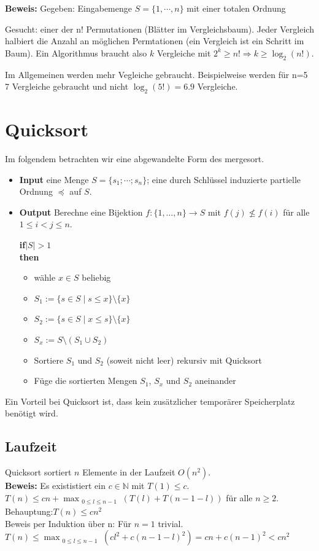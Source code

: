 \documentclass{article}
\begin{document}
\textbf{Beweis:}
Gegeben: Eingabemenge $S=\{1,\cdots,n\}$ mit einer totalen Ordnung

Gesucht: einer der n! Permutationen (Blätter im Vergleichsbaum). 
Jeder Vergleich halbiert die Anzahl an möglichen Permtationen (ein Vergleich ist ein Schritt im Baum).
Ein Algorithmus braucht also $k$ Vergleiche mit $2^k\ge n! $$\Rightarrow k\ge \log_2(n!)$.

Im Allgemeinen werden mehr Vegleiche gebraucht. Beispielweise werden für n=5 7 Vergleiche gebraucht und nicht $\log_2(5!)=6.9$ Vergleiche.

\section{Quicksort}
Im folgendem betrachten wir eine abgewandelte Form des mergesort.

\begin{itemize}\item\textbf{Input}
eine  Menge $S=\{s_1; \cdots ;s_n \}$; eine durch Schlüssel induzierte partielle Ordnung $\preceq$ auf $S$.\item \textbf{Output}
Berechne eine Bijektion $f \colon \{1,\dots,n\} \to S$ mit $f(j) \not\le f(i)$ für alle $1\le i<j \le n$.


\textbf{if}{$|S| > 1$} \\
\textbf{then} \begin{itemize} \item wähle $x\in S$ beliebig
     \item $S_1 := \{s \in S \mid s \leq x\} \setminus \{x\}$
    \item$S_2 := \{s \in S \mid x \leq s\} \setminus \{x\}$
   \item $S_x := S \setminus (S_1 \cup S_2)$
    \item Sortiere $S_1$ und $S_2$ (soweit nicht leer) rekursiv mit Quicksort
    \item  Füge die sortierten Mengen $S_1$, $S_x$ und $S_2$ aneinander
    \end{itemize}
 \end{itemize}
 Ein Vorteil bei Quicksort ist, dass kein zusätzlicher temporärer Speicherplatz benötigt wird.
 \subsection{Laufzeit}
 Quicksort sortiert $n$ Elemente in der Laufzeit $O(n^2)$.\\
 \textbf{Beweis:}
 Es exististiert ein $c\in \mathbb{N}$ mit $T(1) \leq c$.
$T(n)\leq cn + \max_{\substack{0\leq l \leq n-1}}(T(l)+T(n-1-l))
 $ für alle $n\geq 2$.\\
 Behauptung:$T(n)\leq cn^2 $\\
 Beweis per Induktion über n: Für $n=1$ trivial.\\
 $T(n)\leq \max_{\substack{0\leq l \leq n-1}}(cl^2+c(n-1-l)^2) = cn+ c(n-1)^2 < cn^2$
\end{document}
